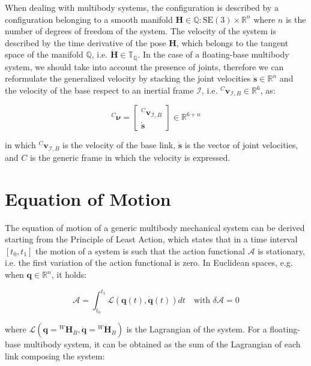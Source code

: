 When dealing with multibody systems, the configuration is described by a configuration belonging to a smooth manifold $\mathbf{H} \in \mathbb{Q} : \mathrm{SE}(3) \times \mathbb{R}^n$ where $n$ is the number of degrees of freedom of the system. The velocity of the system is described by the time derivative of the pose $\mathbf{H}$, which belongs to the tangent space of the manifold $\mathbb{Q}$, i.e. $\dot{\mathbf{H}} \in \mathbb{T}_{\mathbb{Q}}$. In the case of a floating-base multibody system, we should take into account the presence of joints, therefore we can reformulate the generalized velocity by stacking the joint velocities $\dot{\mathbf{s}} \in \mathbb{R}^n$ and the velocity of the base respect to an inertial frame $\mathcal{I}$, i.e. ${}^C\mathbf{v}_{\mathcal{I},B} \in \mathbb{R}^6$, as:

\begin{equation}
    {}^C \boldsymbol{\nu} =
    \begin{bmatrix}
        {}^C \mathbf{v}_{\mathcal{I},B} \\
        \dot{\mathbf{s}}
    \end{bmatrix} \in \mathbb{R}^{6+n}
\end{equation}

in which ${}^C \mathbf{v}_{\mathcal{I},B}$ is the velocity of the base link, $\dot{\mathbf{s}}$ is the vector of joint velocities, and $C$ is the generic frame in which the velocity is expressed.


\section{Equation of Motion}
\label{sec:back_eom}

The equation of motion of a generic multibody mechanical system can be derived starting from the Principle of Least Action, which states that in a time interval $[t _0, t _1]$ the motion of a system is such that the action functional $\mathcal{A}$ is stationary, i.e. the first variation of the action functional is zero. In Euclidean spaces, e.g. when $\mathbf{q} \in \mathbb{R}^n$, it holds:

\begin{equation}
    \mathcal{A} = \int _{t _0} ^{t _1} \mathcal{L} (\mathbf{q}(t), \mathbf{\dot{q}}(t)) dt \quad \text{with } \delta \mathcal{A} = 0
\end{equation}

where $\mathcal{L} (\mathbf{q} = {}^W\mathbf{H} _B, \dot{\mathbf{q}} = {}^W\dot{\mathbf{H}} _B)$ is the Lagrangian of the system. For a floating-base multibody system, it can be obtained as the sum of the Lagrangian of each link composing the system:

